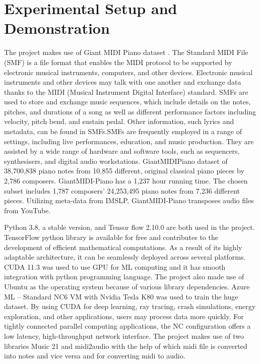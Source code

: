 \documentclass[letterpaper]{article}
\begin{document}
\section{Experimental Setup and Demonstration}
The project makes use of Giant MIDI Piano dataset \cite{b7}. The Standard MIDI File (SMF) is a file format that enables the MIDI protocol to be supported by electronic musical instruments, computers, and other devices. Electronic musical instruments and other devices may talk with one another and exchange data thanks to the MIDI (Musical Instrument Digital Interface) standard. SMFs are used to store and exchange music sequences, which include details on the notes, pitches, and durations of a song as well as different performance factors including velocity, pitch bend, and sustain pedal. Other information, such lyrics and metadata, can be found in SMFs.SMFs are frequently employed in a range of settings, including live performances, education, and music production. They are assisted by a wide range of hardware and software tools, such as sequencers, synthesisers, and digital audio workstations. GiantMIDIPiano dataset of 38,700,838 piano notes from 10,855 different, original classical piano pieces by 2,786 composers. GiantMIDI-Piano has a 1,237 hour running time. The chosen subset includes 1,787 composers' 24,253,495 piano notes from 7,236 different pieces. Utilizing meta-data from IMSLP, GiantMIDI-Piano transposes audio files from YouTube.


Python 3.8, a stable version, and Tensor flow 2.10.0 are both used in the project. TensorFlow python library is available for free and contributes to the development of efficient mathematical computations. As a result of its highly adaptable architecture, it can be seamlessly deployed across several platforms. CUDA 11.3 was used to use GPU for ML computing and it has smooth integration with python programming language. The project also made use of Ubuntu as the operating system because of various library dependencies. Azure ML – Standard NC6 VM with Nvidia Tesla K80 was used to train the huge dataset. By using CUDA for deep learning, ray tracing, crash simulations, energy exploration, and other applications, users may process data more quickly. For tightly connected parallel computing applications, the NC configuration offers a low latency, high-throughput network interface. The project makes use of two libraries Music 21 and midi2audio with the help of which midi file is converted into notes and vice versa and for converting midi to audio.
\end{document}
